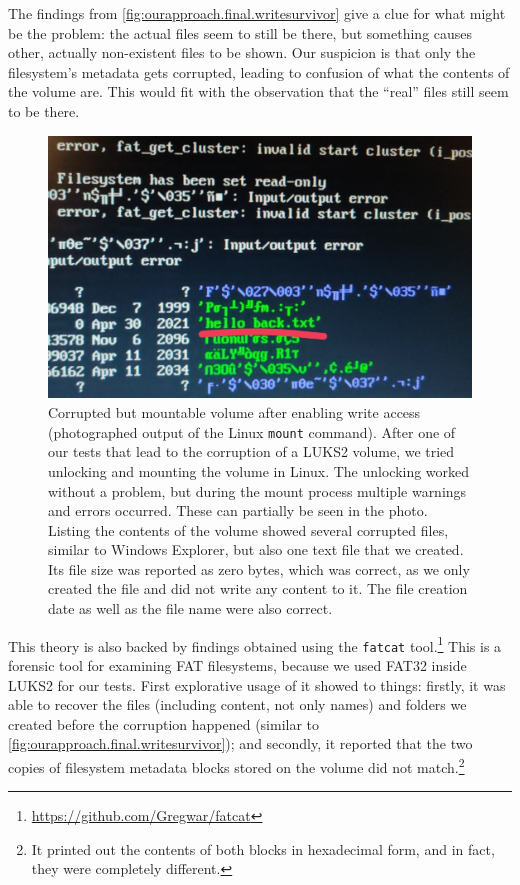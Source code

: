 The findings from \autoref{fig:ourapproach.final.writesurvivor} give a clue for what might be the problem: the actual files seem to still be there, but something causes other, actually non-existent files to be shown. Our suspicion is that only the filesystem's metadata gets corrupted, leading to confusion of what the contents of the volume are. This would fit with the observation that the ``real'' files still seem to be there.

\begin{figure}[htb!]
	\center
	\includegraphics[scale=0.42]{../img/ourapproach.final.writesurvivor.png}
	\caption[
		Corrupted but mountable volume after enabling write access
	]{
		Corrupted but mountable volume after enabling write access (photographed output of the Linux \texttt{mount} command). After one of our tests that lead to the corruption of a LUKS2 volume, we tried unlocking and mounting the volume in Linux. The unlocking worked without a problem, but during the mount process multiple warnings and errors occurred. These can partially be seen in the photo. Listing the contents of the volume showed several corrupted files, similar to Windows Explorer, but also one text file that we created. Its file size was reported as zero bytes, which was correct, as we only created the file and did not write any content to it. The file creation date as well as the file name were also correct.
	}
	\label{fig:ourapproach.final.writesurvivor}
\end{figure}

This theory is also backed by findings obtained using the \texttt{fatcat} tool.\footnote{\label{fn:ourapproach.final.fatcat} \url{https://github.com/Gregwar/fatcat}} This is a forensic tool for examining FAT filesystems, because we used FAT32 inside LUKS2 for our tests. First explorative usage of it showed to things: firstly, it was able to recover the files (including content, not only names) and folders we created before the corruption happened (similar to \autoref{fig:ourapproach.final.writesurvivor}); and secondly, it reported that the two copies of filesystem metadata blocks stored on the volume did not match.\footnote{\label{fn:ourapproach.final.fatdiff} It printed out the contents of both blocks in hexadecimal form, and in fact, they were completely different.}

